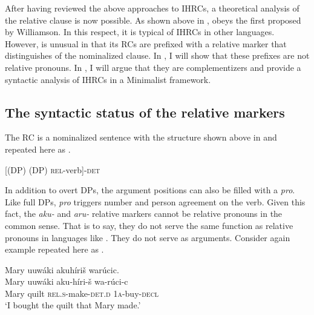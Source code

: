 \documentclass[output=paper]{LSP/langsci}
\begin{document}
After having reviewed the above approaches to IHRCs, a theoretical analysis of the  relative clause is now possible. As shown above in ,  obeys the  first proposed by Williamson. In this respect, it is typical of IHRCs in other languages. However,  is unusual in that its RCs are prefixed with a relative marker that distinguishes  of the nominalized clause. In , I will show that these prefixes are not relative pronouns. In , I will argue that they are complementizers and provide a syntactic analysis of IHRCs in a Minimalist framework.

\subsection{The syntactic status of the  relative markers}\label{sec:boyle:5.1}

The  RC is a nominalized sentence with the structure shown above in  and repeated here as .

\ea  \label{boyle24}
{[(DP) (DP) \textsc{rel}-verb]-\textsc{det}}
\z

In addition to overt DPs, the argument positions can also be filled with a \textit{pro}. Like full DPs, \textit{pro} triggers number and person agreement on the verb. Given this fact, the \textit{aku-} and \textit{aru-} relative markers cannot be relative pronouns in the common sense. That is to say, they do not serve the same function as relative pronouns in languages like . They do not serve as arguments. Consider again example  repeated here as .

\ea \label{boyle25}
 \glll Mary uuw\'aki akuh\'iri\v{s} war\'ucic.\\
Mary uuw\'aki aku-h\'iri-\v{s}         wa-r\'uci-c\\
Mary quilt   \textsc{rel.s}-make-\textsc{det.d} \textsc{1a}-buy-\textsc{decl}\\
\trans `I bought the quilt that Mary made.' 
\z
\end{document}
